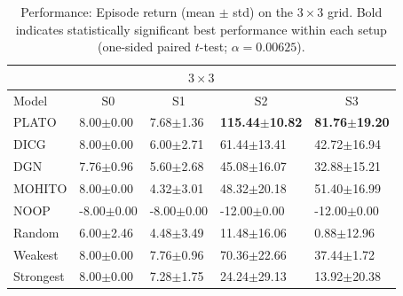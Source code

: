 \begin{table}[t]
\centering
\small
\setlength{\tabcolsep}{2.5pt}
\renewcommand{\arraystretch}{1.03}
\begin{tabular}{l|l|l|l|l}
\toprule
\multicolumn{5}{c}{$3\times 3$} \\
\midrule
Model & \multicolumn{1}{c|}{S0} & \multicolumn{1}{c|}{S1} & \multicolumn{1}{c|}{S2} & \multicolumn{1}{c}{S3} \\
\midrule
PLATO & 8.00$\pm$0.00 & 7.68$\pm$1.36 & \textbf{115.44$\pm$10.82} & \textbf{81.76$\pm$19.20} \\
DICG & 8.00$\pm$0.00 & 6.00$\pm$2.71 & 61.44$\pm$13.41 & 42.72$\pm$16.94 \\
DGN & 7.76$\pm$0.96 & 5.60$\pm$2.68 & 45.08$\pm$16.07 & 32.88$\pm$15.21 \\
MOHITO & 8.00$\pm$0.00 & 4.32$\pm$3.01 & 48.32$\pm$20.18 & 51.40$\pm$16.99 \\
NOOP & -8.00$\pm$0.00 & -8.00$\pm$0.00 & -12.00$\pm$0.00 & -12.00$\pm$0.00 \\
Random & 6.00$\pm$2.46 & 4.48$\pm$3.49 & 11.48$\pm$16.06 & 0.88$\pm$12.96 \\
Weakest & 8.00$\pm$0.00 & 7.76$\pm$0.96 & 70.36$\pm$22.66 & 37.44$\pm$1.72 \\
Strongest & 8.00$\pm$0.00 & 7.28$\pm$1.75 & 24.24$\pm$29.13 & 13.92$\pm$20.38 \\

\bottomrule
\end{tabular}
\caption{Performance: Episode return (mean $\pm$ std) on the $3\times 3$ grid. Bold indicates statistically significant best performance within each setup (one-sided paired $t$-test; $\alpha=0.00625$).}
\label{tab:reward_3x3}
\end{table}





